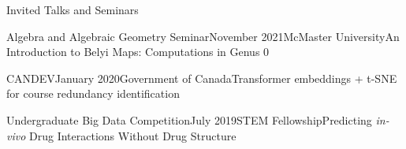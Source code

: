 \begin{rSection}{Invited Talks and Seminars}

\begin{rSubsection}{Algebra and Algebraic Geometry Seminar}{November 2021}{McMaster University}{An Introduction to Belyi Maps: Computations in Genus 0}
\end{rSubsection}
\smallskip

\begin{rSubsection}{CANDEV}{January 2020}{Government of Canada}{Transformer embeddings + t-SNE for course redundancy identification}
\end{rSubsection}
\smallskip

\begin{rSubsection}{Undergraduate Big Data Competition}{July 2019}{STEM Fellowship}{Predicting \textit{in-vivo} Drug Interactions Without Drug Structure}
\end{rSubsection}




\end{rSection}
